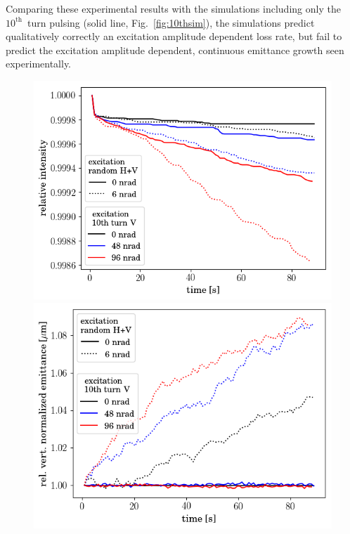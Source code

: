 \documentclass[%
 reprint,
 amsmath,amssymb,
 aps,
prstab,
]{revtex4-1}
\begin{document}
Comparing these experimental results with the simulations including only the $10^{\mathrm{th}}$~turn pulsing (solid line, Fig.~\ref{fig:10thsim}), the simulations predict qualitatively correctly an excitation amplitude dependent loss rate, but fail to predict the excitation amplitude dependent, continuous emittance growth seen experimentally.
\begin{figure}[h]
	\begin{minipage}[t]{0.49\linewidth}
		\centering
		\includegraphics[width=1.0\linewidth]{2016injerra2b2uran1_2e-3_10thV_3_5um_intensity.png}
	\end{minipage}
	\begin{minipage}[t]{0.49\linewidth}
		\centering
		\includegraphics[width=1.0\linewidth]{2016injerra2b2uran1_2e-3_10thV_3_5um_emit2_rel.png}

\end{minipage}
\end{figure}
\end{document}
